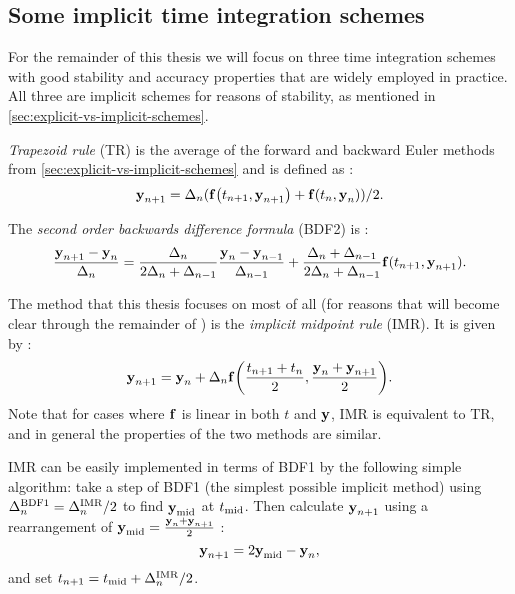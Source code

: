 \subsection{Some implicit time integration schemes}
\label{sec:some-implicit-time-integrators}

For the remainder of this thesis we will focus on three time integration schemes with good stability and accuracy properties that are widely employed in practice.
All three are implicit schemes for reasons of stability, as mentioned in \cref{sec:explicit-vs-implicit-schemes}.

\emph{Trapezoid rule} (TR) is the average of the forward and backward Euler methods from \cref{sec:explicit-vs-implicit-schemes} and is defined as \cite[260]{GreshoSani}:
\begin{equation}
  \boldsymbol{\mathrm{y}}_{n+1} = \Delta_{n} ({\boldsymbol{\mathrm{f}}{\left( t_{n+1}, \boldsymbol{\mathrm{y}}_{n+1} \right)}} + {\boldsymbol{\mathrm{f}}{\left( t_n, \boldsymbol{\mathrm{y}}_n \right)}})/2.
  \label{eq:tr-definition}
\end{equation}

The \emph{second order backwards difference formula} (BDF2) is \cite[715]{GreshoSani}:
\begin{equation}
  \frac{\boldsymbol{\mathrm{y}}_{n+1} - \boldsymbol{\mathrm{y}}_n}{\Delta_{n}} = \frac{\Delta_{n}}{2\Delta_{n} + \Delta_{n-1}} \frac{\boldsymbol{\mathrm{y}}_n - \boldsymbol{\mathrm{y}}_{n-1}}{\Delta_{n-1}}
  + \frac{\Delta_{n} + \Delta_{n-1}}{2\Delta_{n} + \Delta_{n-1}} {\boldsymbol{\mathrm{f}}}(t_{n+1}, \boldsymbol{\mathrm{y}}_{n+1}).
\end{equation}

The method that this thesis focuses on most of all (for reasons that will become clear through the remainder of ) is the \emph{implicit midpoint rule} (IMR).
It is given by \cite[263]{GreshoSani}:
\begin{equation}
  \label{eq:imr-definition}
  \boldsymbol{\mathrm{y}}_{n+1} = \boldsymbol{\mathrm{y}}_n + \Delta_{n} {\boldsymbol{\mathrm{f}}{\left( \frac{t_{n+1} + t_n}{2}, \frac{\boldsymbol{\mathrm{y}}_n + \boldsymbol{\mathrm{y}}_{n+1}}{2} \right)}}.
\end{equation}
Note that for cases where ${\boldsymbol{\mathrm{f}}}$ is linear in both $t$ and $\boldsymbol{\mathrm{y}}$, IMR is equivalent to TR, and in general the properties of the two methods are similar.

IMR can be easily implemented in terms of BDF1 by the following simple algorithm: take a step of BDF1 (the simplest possible implicit method) using $\Delta_{n}^{\mathrm{BDF1}} = \Delta_{n}^{\mathrm{IMR}}/2$ to find $\boldsymbol{\mathrm{y}}_{\mathrm{mid}}$ at $t_{\mathrm{mid}}$.
Then calculate $\boldsymbol{\mathrm{y}}_{n+1}$ using a rearrangement of $\boldsymbol{\mathrm{y}}_{\mathrm{mid}} = \frac{\boldsymbol{\mathrm{y}}_n + \boldsymbol{\mathrm{y}}_{n+1}}{2}$ \cite{Malidi2005}:
\begin{equation}
    \boldsymbol{\mathrm{y}}_{n+1} = 2\boldsymbol{\mathrm{y}}_{\mathrm{mid}} - \boldsymbol{\mathrm{y}}_n,
\end{equation}
and set $t_{n+1} = t_{\mathrm{mid}} + \Delta_{n}^{\mathrm{IMR}}/2$.

